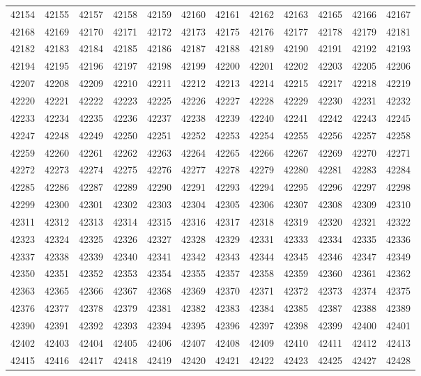 \begin{center}
\begin{longtable}{llllllllllll}
42154 &42155 &42157 &42158 &42159 &42160 &42161 &42162 &42163 &42165 &42166 &42167 \\
42168 &42169 &42170 &42171 &42172 &42173 &42175 &42176 &42177 &42178 &42179 &42181 \\
42182 &42183 &42184 &42185 &42186 &42187 &42188 &42189 &42190 &42191 &42192 &42193 \\
42194 &42195 &42196 &42197 &42198 &42199 &42200 &42201 &42202 &42203 &42205 &42206 \\
42207 &42208 &42209 &42210 &42211 &42212 &42213 &42214 &42215 &42217 &42218 &42219 \\
42220 &42221 &42222 &42223 &42225 &42226 &42227 &42228 &42229 &42230 &42231 &42232 \\
42233 &42234 &42235 &42236 &42237 &42238 &42239 &42240 &42241 &42242 &42243 &42245 \\
42247 &42248 &42249 &42250 &42251 &42252 &42253 &42254 &42255 &42256 &42257 &42258 \\
42259 &42260 &42261 &42262 &42263 &42264 &42265 &42266 &42267 &42269 &42270 &42271 \\
42272 &42273 &42274 &42275 &42276 &42277 &42278 &42279 &42280 &42281 &42283 &42284 \\
42285 &42286 &42287 &42289 &42290 &42291 &42293 &42294 &42295 &42296 &42297 &42298 \\
42299 &42300 &42301 &42302 &42303 &42304 &42305 &42306 &42307 &42308 &42309 &42310 \\
42311 &42312 &42313 &42314 &42315 &42316 &42317 &42318 &42319 &42320 &42321 &42322 \\
42323 &42324 &42325 &42326 &42327 &42328 &42329 &42331 &42333 &42334 &42335 &42336 \\
42337 &42338 &42339 &42340 &42341 &42342 &42343 &42344 &42345 &42346 &42347 &42349 \\
42350 &42351 &42352 &42353 &42354 &42355 &42357 &42358 &42359 &42360 &42361 &42362 \\
42363 &42365 &42366 &42367 &42368 &42369 &42370 &42371 &42372 &42373 &42374 &42375 \\
42376 &42377 &42378 &42379 &42381 &42382 &42383 &42384 &42385 &42387 &42388 &42389 \\
42390 &42391 &42392 &42393 &42394 &42395 &42396 &42397 &42398 &42399 &42400 &42401 \\
42402 &42403 &42404 &42405 &42406 &42407 &42408 &42409 &42410 &42411 &42412 &42413 \\
42415 &42416 &42417 &42418 &42419 &42420 &42421 &42422 &42423 &42425 &42427 &42428 \\

\end{longtable}
\end{center}
